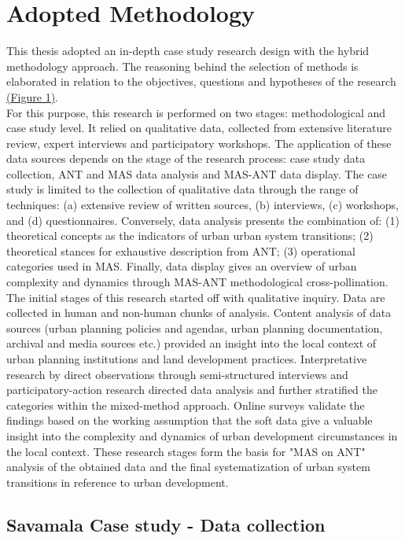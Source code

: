 \documentclass[11pt]{report}
\begin{document}
\section{Adopted Methodology}

This thesis adopted an in-depth case study research design with the hybrid methodology approach. The reasoning behind the selection of methods is elaborated in relation to the objectives, questions and hypotheses of the research \href{}{(Figure 1)}.  
\\
For this purpose, this research is performed on two stages: methodological and case study level. It relied on qualitative data, collected from extensive literature review, expert interviews and participatory workshops. The application of these data sources depends on the stage of the research process: case study data collection, ANT and MAS data analysis and MAS-ANT data display. The case study is limited to the collection of qualitative data through the range of techniques: (a) extensive review of written sources, (b) interviews, (c) workshops, and (d) questionnaires. Conversely, data analysis presents the combination of: (1) theoretical concepts as the indicators of urban urban system transitions; (2) theoretical stances for exhaustive description from ANT; (3) operational categories used in MAS. Finally, data display gives an overview of urban complexity and dynamics through MAS-ANT methodological cross-pollination. 
\\
The initial stages of this research started off with qualitative inquiry. Data are collected in human and non-human chunks of analysis. Content analysis of data sources (urban planning policies and agendas, urban planning documentation, archival and media sources etc.) provided an insight into the local context of urban planning institutions and land development practices. Interpretative research by  direct observations through semi-structured interviews and participatory-action research directed data analysis and further stratified the categories within the mixed-method approach.
Online surveys validate the findings based on the working assumption that the soft data give a valuable insight into the complexity and dynamics of urban development circumstances in the local context. These research stages form the basis for "MAS on ANT" analysis of the obtained data and the final systematization of urban system transitions in reference to urban development.

\subsection{Savamala Case study - Data collection} \label{sec:predis}
\end{document}
